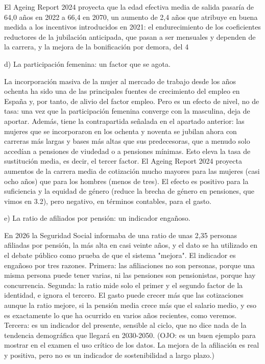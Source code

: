 \documentclass[10pt,a4paper]{article}
\begin{document}
El Ageing Report 2024 proyecta que la edad efectiva media de salida pasaría de 64,0 años en 2022 a 66,4 en 2070, un aumento de 2,4 años que atribuye en buena medida a los incentivos introducidos en 2021: el endurecimiento de los coeficientes reductores de la jubilación anticipada, que pasan a ser mensuales y dependen de la carrera, y la mejora de la bonificación por demora, del 4%

d) La participación femenina: un factor que se agota.

La incorporación masiva de la mujer al mercado de trabajo desde los años ochenta ha sido una de las principales fuentes de crecimiento del empleo en España y, por tanto, de alivio del factor empleo. Pero es un efecto de nivel, no de tasa: una vez que la participación femenina converge con la masculina, deja de aportar. Además, tiene la contrapartida señalada en el apartado anterior: las mujeres que se incorporaron en los ochenta y noventa se jubilan ahora con carreras más largas y bases más altas que sus predecesoras, que a menudo solo accedían a pensiones de viudedad o a pensiones mínimas. Esto eleva la tasa de sustitución media, es decir, el tercer factor. El Ageing Report 2024 proyecta aumentos de la carrera media de cotización mucho mayores para las mujeres (casi ocho años) que para los hombres (menos de tres). El efecto es positivo para la suficiencia y la equidad de género (reduce la brecha de género en pensiones, que vimos en 3.2), pero negativo, en términos contables, para el gasto.

e) La ratio de afiliados por pensión: un indicador engañoso.

En 2026 la Seguridad Social informaba de una ratio de unas 2,35 personas afiliadas por pensión, la más alta en casi veinte años, y el dato se ha utilizado en el debate público como prueba de que el sistema "mejora". El indicador es engañoso por tres razones. Primera: las afiliaciones no son personas, porque una misma persona puede tener varias, ni las pensiones son pensionistas, porque hay concurrencia. Segunda: la ratio mide solo el primer y el segundo factor de la identidad, e ignora el tercero. El gasto puede crecer más que las cotizaciones aunque la ratio mejore, si la pensión media crece más que el salario medio, y eso es exactamente lo que ha ocurrido en varios años recientes, como veremos. Tercera: es un indicador del presente, sensible al ciclo, que no dice nada de la tendencia demográfica que llegará en 2030-2050. (OJO: es un buen ejemplo para mostrar en el examen el uso crítico de los datos. La mejora de la afiliación es real y positiva, pero no es un indicador de sostenibilidad a largo plazo.)
\end{document}
